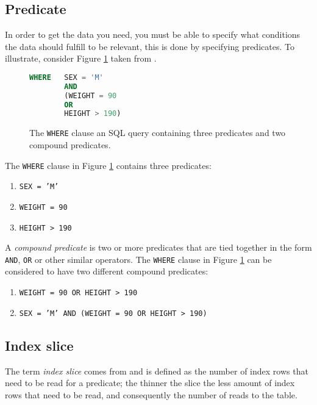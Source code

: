 \subsection*{Predicate}
In order to get the data you need, you must be able to specify what conditions the data should fulfill to be relevant, this is done by specifying predicates. To illustrate, consider Figure \ref{fig:sql:predicate} taken from \cite{lahdenmaki_2005_relational_rdidatodossea}.

\begin{figure}[ht]
\begin{lstlisting}[language=SQL]
WHERE   SEX = 'M'
        AND
        (WEIGHT = 90
        OR
        HEIGHT > 190)
\end{lstlisting}
\caption[The \texttt{WHERE} clause of a query containing three predicates and two compound predicates]{The \texttt{WHERE} clause an SQL query containing three predicates and two compound predicates.}\label{fig:sql:predicate}
\end{figure}

The \texttt{WHERE} clause in Figure \ref{fig:sql:predicate} contains three predicates:
\begin{enumerate}
    \item \texttt{SEX = 'M'}
    \item \texttt{WEIGHT = 90}
    \item \texttt{HEIGHT > 190}
\end{enumerate}

A \textit{compound predicate} is two or more predicates that are tied together in the form \texttt{AND}, \texttt{OR} or other similar operators. The \texttt{WHERE} clause in Figure \ref{fig:sql:predicate} can be considered to have two different compound predicates:
\begin{enumerate}
    \item \texttt{WEIGHT = 90 OR HEIGHT > 190}
    \item \texttt{SEX = 'M' AND (WEIGHT = 90 OR HEIGHT > 190)}
\end{enumerate}

\subsection*{Index slice}
The term \textit{index slice} comes from \cite{lahdenmaki_2005_relational_rdidatodossea} and is defined as the number of index rows that need to be read for a predicate; the thinner the slice the less amount of index rows that need to be read, and consequently the number of reads to the table.


